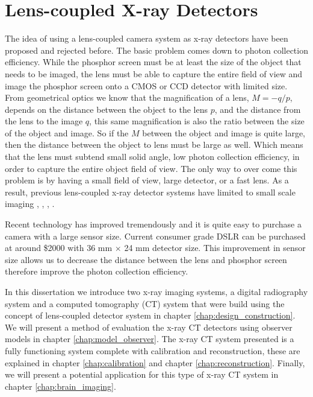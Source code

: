 \section{Lens-coupled X-ray Detectors}
The idea of using a lens-coupled camera system as x-ray detectors have been proposed and rejected before.  The basic problem comes down to photon collection efficiency.  While the phosphor screen must be at least the size of the object that needs to be imaged, the lens must be able to capture the entire field of view and image the phosphor screen onto a CMOS or CCD detector with limited size.  From geometrical optics we know that the magnification of a lens, $M = -q/p$, depends on the distance between the object to the lens $p$, and the distance from the lens to the image $q$, this same magnification is also the ratio between the size of the object and image.  So if the $M$ between the object and image is quite large, then the distance between the object to lens must be large as well.  Which means that the lens must subtend small solid angle, low photon collection efficiency, in order to capture the entire object field of view.  The only way to over come this problem is by having a small field of view, large detector, or a fast lens.  As a result, previous lens-coupled x-ray detector systems have limited to small scale imaging \cite{kim2005}, \cite{lee2001}, \cite{tate2005}, \cite{madden2006}.  

Recent technology has improved tremendously and it is quite easy to purchase a camera with a large sensor size.  Current consumer grade DSLR can be purchased at around \$2000 with 36 mm $\times$ 24 mm detector size.  This improvement in sensor size allows us to decrease the distance between the lens and phosphor screen therefore improve the photon collection efficiency.

In this dissertation we introduce two x-ray imaging systems, a digital radiography system and a computed tomography (CT) system that were build using the concept of lens-coupled detector system in chapter \ref{chap:design_construction}.  We will present a method of evaluation the x-ray CT detectors using observer models in chapter \ref{chap:model_observer}.   The x-ray CT system presented is a fully functioning system complete with calibration and reconstruction, these are explained in chapter \ref{chap:calibration} and chapter \ref{chap:reconstruction}.  Finally, we will present a potential application for this type of x-ray CT system in chapter \ref{chap:brain_imaging}.  
